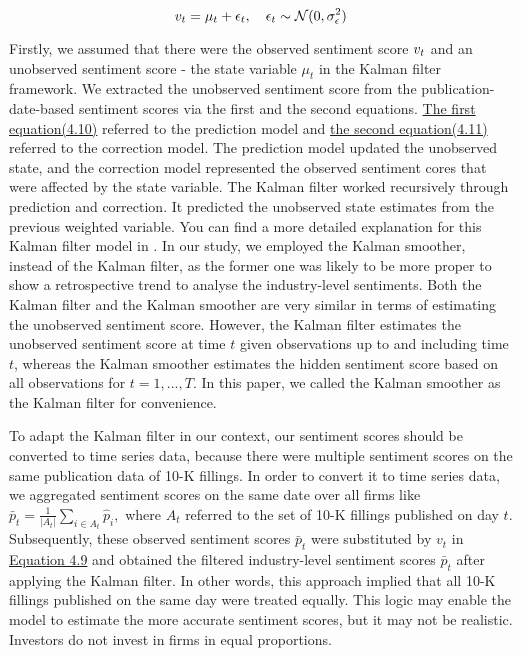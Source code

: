 \documentclass[logo,bsc,singlespacing,parskip]{infthesis}
\begin{document}
\begin{equation} \label{4.11}
\\v_t = \mu_t + \epsilon_t, \quad \epsilon_t \sim \mathcal{N}(0, \sigma_{\epsilon}^2)
\end{equation}

Firstly, we assumed that there were the observed sentiment score $\\v_t$ and an unobserved sentiment score - the state variable $\mu_t$ in the Kalman filter framework. We extracted the unobserved sentiment score from the publication-date-based sentiment scores via the first and the second equations. \hyperref[4.10]{The first equation(4.10)} referred to the prediction model and \hyperref[4.11]{the second equation(4.11)} referred to the correction model. The prediction model updated the unobserved state, and the correction model represented the observed sentiment cores that were affected by the state variable. The Kalman filter worked recursively through prediction and correction. It predicted the unobserved state estimates from the previous weighted variable. You can find a more detailed explanation for this Kalman filter model in \cite{durbin2012time}. In our study, we employed the Kalman smoother, instead of the Kalman filter, as the former one was likely to be more proper to show a retrospective trend to analyse the industry-level sentiments. Both the Kalman filter and the Kalman smoother are very similar in terms of estimating the unobserved sentiment score. However, the Kalman filter estimates the unobserved sentiment score at time $t$ given observations up to and including time $t$, whereas the Kalman smoother estimates the hidden sentiment score based on all observations for $t = 1,..., T$. In this paper, we called the Kalman smoother as the Kalman filter for convenience.   

To adapt the Kalman filter in our context, our sentiment scores should be converted to time series data, because there were multiple sentiment scores on the same publication data of 10-K fillings. In order to convert it to time series data, we aggregated sentiment scores on the same date over all firms like $\bar{p}_t = \frac{1}{|A_t|} \sum_{i \in A_t} \hat{p}_i,$ where $A_t$ referred to the set of 10-K fillings published on day $t$. Subsequently, these observed sentiment scores $\bar{p}_t$ were substituted by $v_t$ in \hyperref[4.9]{Equation 4.9} and obtained the filtered industry-level sentiment scores $\bar{p}_t$ after applying the Kalman filter. In other words, this approach implied that all 10-K fillings published on the same day were treated equally. This logic may enable the model to estimate the more accurate sentiment scores, but it may not be realistic. Investors do not invest in firms in equal proportions.
\end{document}
